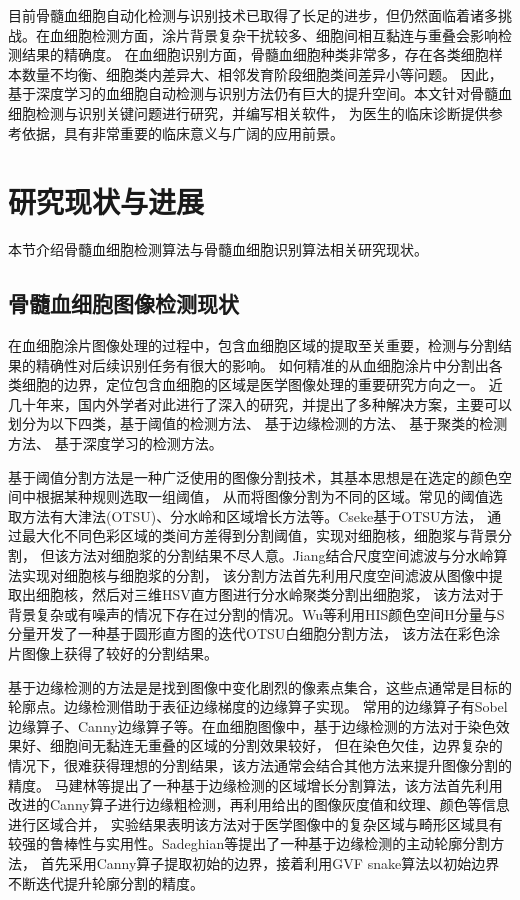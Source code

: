 目前骨髓血细胞自动化检测与识别技术已取得了长足的进步，但仍然面临着诸多挑战。在血细胞检测方面，涂片背景复杂干扰较多、细胞间相互黏连与重叠会影响检测结果的精确度。
在血细胞识别方面，骨髓血细胞种类非常多，存在各类细胞样本数量不均衡、细胞类内差异大、相邻发育阶段细胞类间差异小等问题。
因此，基于深度学习的血细胞自动检测与识别方法仍有巨大的提升空间。本文针对骨髓血细胞检测与识别关键问题进行研究，并编写相关软件，
为医生的临床诊断提供参考依据，具有非常重要的临床意义与广阔的应用前景。



\section{研究现状与进展}
本节介绍骨髓血细胞检测算法与骨髓血细胞识别算法相关研究现状。
\subsection{骨髓血细胞图像检测现状}
在血细胞涂片图像处理的过程中，包含血细胞区域的提取至关重要，检测与分割结果的精确性对后续识别任务有很大的影响。
如何精准的从血细胞涂片中分割出各类细胞的边界，定位包含血细胞的区域是医学图像处理的重要研究方向之一。
近几十年来，国内外学者对此进行了深入的研究，并提出了多种解决方案，主要可以划分为以下四类，基于阈值的检测方法\cite{1992A,2003A,Wu2006}、
基于边缘检测的方法\cite{Ma2008Novel,Sadeghian2009A}、
基于聚类的检测方法\cite{theera2005white, ramoser2006leukocyte}、
基于深度学习的检测方法。

基于阈值分割方法是一种广泛使用的图像分割技术，其基本思想是在选定的颜色空间中根据某种规则选取一组阈值，
从而将图像分割为不同的区域。常见的阈值选取方法有大津法(OTSU)、分水岭和区域增长方法等。Cseke\cite{1992A}基于OTSU方法，
通过最大化不同色彩区域的类间方差得到分割阈值，实现对细胞核，细胞浆与背景分割，
但该方法对细胞浆的分割结果不尽人意。Jiang\cite{2003A}结合尺度空间滤波与分水岭算法实现对细胞核与细胞浆的分割，
该分割方法首先利用尺度空间滤波从图像中提取出细胞核，然后对三维HSV直方图进行分水岭聚类分割出细胞浆，
该方法对于背景复杂或有噪声的情况下存在过分割的情况。Wu\cite{Wu2006}等利用HIS颜色空间H分量与S分量开发了一种基于圆形直方图的迭代OTSU白细胞分割方法，
该方法在彩色涂片图像上获得了较好的分割结果。

基于边缘检测的方法是是找到图像中变化剧烈的像素点集合，这些点通常是目标的轮廓点。边缘检测借助于表征边缘梯度的边缘算子实现。
常用的边缘算子有Sobel边缘算子、Canny边缘算子等。在血细胞图像中，基于边缘检测的方法对于染色效果好、细胞间无黏连无重叠的区域的分割效果较好，
但在染色欠佳，边界复杂的情况下，很难获得理想的分割结果，该方法通常会结合其他方法来提升图像分割的精度。
马建林\cite{Ma2008Novel}等提出了一种基于边缘检测的区域增长分割算法，该方法首先利用改进的Canny算子进行边缘粗检测，再利用给出的图像灰度值和纹理、颜色等信息进行区域合并，
实验结果表明该方法对于医学图像中的复杂区域与畸形区域具有较强的鲁棒性与实用性。Sadeghian\cite{Sadeghian2009A}等提出了一种基于边缘检测的主动轮廓分割方法，
首先采用Canny算子提取初始的边界，接着利用GVF snake算法以初始边界不断迭代提升轮廓分割的精度。

